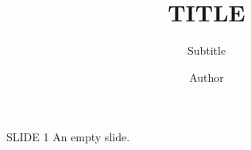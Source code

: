 \documentclass[10pt]{beamer}
\title{TITLE}
\subtitle{Subtitle}
\author{Author}
\institute{Affiliation}
\begin{document}
{
	\begin{frame}
		\titlepage
	\end{frame}
}

\begin{frame}{SLIDE 1}
	An empty slide.
\end{frame}
\end{document}
